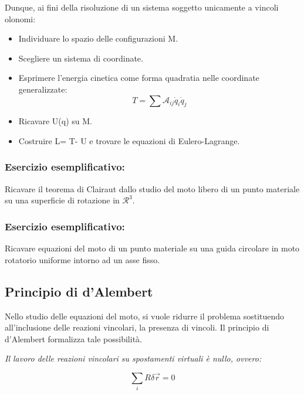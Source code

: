 \documentclass{article}
\begin{document}
            Dunque, ai fini della risoluzione di un sistema soggetto unicamente a vincoli olonomi:

            \begin{itemize}
                \item Individuare lo spazio delle configurazioni M.
                \item Scegliere un sistema di coordinate.
                \item Esprimere l'energia cinetica come forma quadratia nelle coordinate generalizzate:
                      \begin{equation}
                          T= \sum \mathcal{A}_{ij} \dot q_i \dot q_j
                      \end{equation}
                \item Ricavare U(q) su M.
                \item Costruire L= T- U e trovare le equazioni di Eulero-Lagrange.
            \end{itemize}

            \subsubsection{Esercizio esemplificativo:}
            Ricavare il teorema di Clairaut dallo studio del moto libero di un punto materiale su una superficie di rotazione in $\mathcal{R}^3$.

            \subsubsection{Esercizio esemplificativo:}
            Ricavare equazioni del moto di un punto materiale su una guida circolare in moto rotatorio uniforme intorno ad un asse fisso.

            \subsection{Principio di d'Alembert}
            Nello studio delle equazioni del moto, si vuole ridurre il problema sostituendo all'inclusione delle reazioni vincolari, la presenza di vincoli. Il principio di d'Alembert formalizza tale possibilità.

            \textit{Il lavoro delle reazioni vincolari su spostamenti virtuali è nullo, ovvero:}

            \begin{equation}
                \sum_i R \delta \vec{r}=0
            \end{equation}
\end{document}
